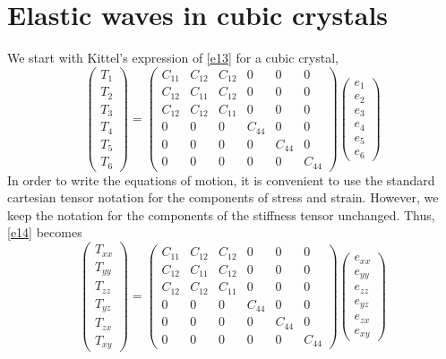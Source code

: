 \documentclass{article}
\begin{document}
\section{Elastic waves in cubic crystals}
We start with Kittel's expression of \eqref{e13} for a cubic crystal,
\begin{equation}\label{e14}
\begin{pmatrix}T_1 \\ T_2 \\ T_3 \\ T_4 \\ T_5 \\ T_6\end{pmatrix} = 
\begin{pmatrix}
C_{11} & C_{12} & C_{12} & 0 & 0 & 0 \\
C_{12} & C_{11} & C_{12} & 0 & 0 & 0 \\
C_{12} & C_{12} & C_{11} & 0 & 0 & 0 \\
0 & 0 & 0 & C_{44} & 0 & 0 \\
0 & 0 & 0 & 0 & C_{44} & 0 \\
0 & 0 & 0 & 0 & 0 & C_{44}
\end{pmatrix}
\begin{pmatrix}e_1 \\ e_2 \\ e_3 \\ e_4 \\ e_5 \\ e_6\end{pmatrix}
\end{equation}
In order to write the equations of motion, it is convenient to use the 
standard cartesian tensor notation for the components of stress and strain.
However, we keep the notation for the components of the stiffness tensor 
unchanged. Thus, \eqref{e14} becomes
\begin{equation}\label{e15}
\begin{pmatrix}T_{xx} \\ T_{yy} \\ T_{zz} \\ T_{yz} \\ T_{zx} \\ T_{xy}
\end{pmatrix} = 
\begin{pmatrix}
C_{11} & C_{12} & C_{12} & 0 & 0 & 0 \\
C_{12} & C_{11} & C_{12} & 0 & 0 & 0 \\
C_{12} & C_{12} & C_{11} & 0 & 0 & 0 \\
0 & 0 & 0 & C_{44} & 0 & 0 \\
0 & 0 & 0 & 0 & C_{44} & 0 \\
0 & 0 & 0 & 0 & 0 & C_{44}
\end{pmatrix}
\begin{pmatrix}e_{xx} \\ e_{yy} \\ e_{zz} \\ e_{yz} \\ e_{zx} \\ e_{xy}
\end{pmatrix}
\end{equation}
\end{document}
